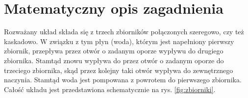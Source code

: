 \chapter{Matematyczny opis zagadnienia}
\label{cha:model}

\newtheorem{torricelli}{Prawo Torricellego}[chapter]
\newtheorem{mass}{Prawo zachowania masy}[chapter]
\newtheorem{pontriagin-max}{Zasada maksimum Pontriagina}[chapter]

Rozważany układ składa się z trzech zbiorników połączonych szeregowo, czy też kaskadowo.
W związku z tym płyn (woda), którym jest napełniony pierwszy zbiornik, przepływa przez otwór o zadanym oporze wypływu do drugiego zbiornika.
Stamtąd znowu wypływa do przez otwór o zadanym oporze do trzeciego zbiornika, skąd przez kolejny taki otwór wypływa do zewnętrznego naczynia.
Stamtąd woda jest pompowana z powrotem do pierwszego zbiornika.
Całość układu jest przedstawiona schematycznie na rys. \ref{fig:zbiorniki}.


